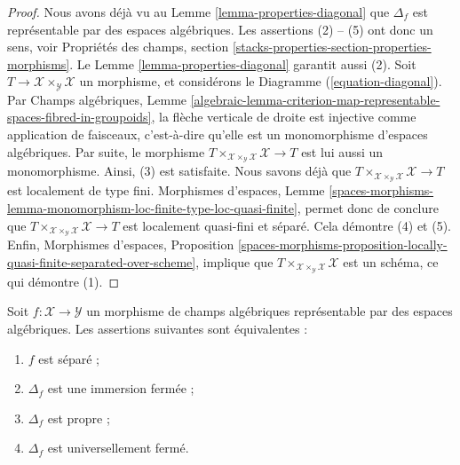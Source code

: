 \begin{proof}
Nous avons déjà vu au Lemme \ref{lemma-properties-diagonal} que $\Delta_f$
est représentable par des espaces algébriques. Les assertions (2) -- (5) ont
donc un sens, voir Propriétés des champs,
section \ref{stacks-properties-section-properties-morphisms}. Le Lemme
\ref{lemma-properties-diagonal} garantit aussi (2). Soit
$T\to\mathcal{X}\times_\mathcal{Y}\mathcal{X}$ un morphisme, et considérons
le Diagramme (\ref{equation-diagonal}). Par Champs algébriques, Lemme
\ref{algebraic-lemma-criterion-map-representable-spaces-fibred-in-groupoids},
la flèche verticale de droite est injective comme application de faisceaux,
c'est-à-dire qu'elle est un monomorphisme d'espaces algébriques. Par suite, le
morphisme
$T\times_{\mathcal{X}\times_\mathcal{Y}\mathcal{X}}\mathcal{X}\to T$
est lui aussi un monomorphisme. Ainsi, (3) est satisfaite. Nous savons déjà que
$T\times_{\mathcal{X}\times_\mathcal{Y}\mathcal{X}}\mathcal{X}\to T$ est
localement de type fini. Morphismes d'espaces, Lemme
\ref{spaces-morphisms-lemma-monomorphism-loc-finite-type-loc-quasi-finite},
permet donc de conclure que
$T\times_{\mathcal{X}\times_\mathcal{Y}\mathcal{X}}\mathcal{X}\to T$
est localement quasi-fini et séparé.
Cela démontre (4) et (5). Enfin, Morphismes d'espaces, Proposition
\ref{spaces-morphisms-proposition-locally-quasi-finite-separated-over-scheme},
implique que
$T\times_{\mathcal{X}\times_\mathcal{Y}\mathcal{X}}\mathcal{X}$ est un
schéma, ce qui démontre (1).
\end{proof}

\begin{lemma}
\label{lemma-representable-separated-diagonal-closed}
Soit $f:\mathcal{X}\to\mathcal{Y}$ un morphisme de champs algébriques
représentable par des espaces algébriques. Les assertions suivantes sont
équivalentes :
\begin{enumerate}
\item $f$ est séparé ;
\item $\Delta_f$ est une immersion fermée ;
\item $\Delta_f$ est propre ;
\item $\Delta_f$ est universellement fermé.
\end{enumerate}
\end{lemma}

